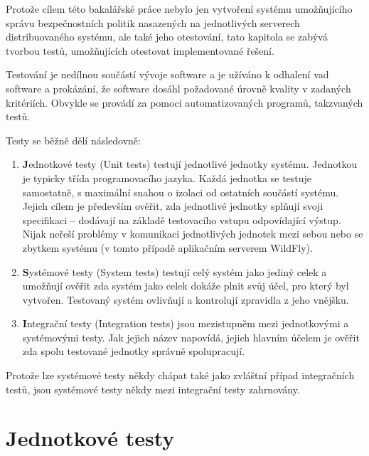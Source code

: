 Protože cílem této bakalářské práce nebylo jen vytvoření systému umožňujícího správu bezpečnostních politik nasazených na jednotlivých serverech distribuovaného systému, ale také jeho otestování, tato kapitola se zabývá tvorbou testů, umožňujících otestovat implementované řešení.

Testování je nedílnou součástí vývoje software a je užíváno k odhalení vad software a prokázání, že software dosáhl požadované úrovně kvality v zadaných kritériích. Obvykle se provádí za pomoci automatizovaných programů, takzvaných testů. \cite{ivsTest}

Testy se běžně dělí následovně: \cite{testsTypes}\cite{ivsTest}

\begin{enumerate}
  
  \item {\textbf Jednotkové testy (Unit tests)} testují jednotlivé jednotky systému. Jednotkou je typicky třída programovacího jazyka. Každá jednotka se testuje samostatně, s maximální snahou o izolaci od ostatních součástí systému. Jejich cílem je především ověřit, zda jednotlivé jednotky splňují svoji specifikaci -- dodávají na základě testovacího vstupu odpovídající výstup. Nijak neřeší problémy v komunikaci jednotlivých jednotek mezi sebou nebo se zbytkem systému (v tomto případě aplikačním serverem WildFly). \cite{testsTypes}\cite{ivsTest}
  
  \item {\textbf Systémové testy (System tests)} testují celý systém jako jediný celek a umožňují ověřit zda systém jako celek dokáže plnit svůj účel, pro který byl vytvořen. Testovaný systém ovlivňují a kontrolují zpravidla z jeho vnějšku. \cite{testsTypes}\cite{ivsTest}
  
  \item {\textbf Integrační testy (Integration tests)} jsou mezistupněm mezi jednotkovými a systémovými testy. Jak jejich název napovídá, jejich hlavním účelem je ověřit zda spolu testované jednotky správně spolupracují. \cite{testsTypes}\cite{ivsTest}
  
\end{enumerate}

Protože lze systémové testy někdy chápat také jako zvláštní případ integračních testů, jsou systémové testy někdy mezi integrační testy zahrnovány. \cite{testsUnitVsInteg}

\section{Jednotkové testy}

